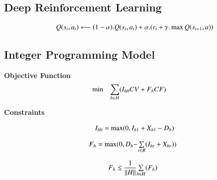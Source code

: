 \documentclass{elsarticle}
\begin{document}
\subsection{Deep Reinforcement Learning}


\begin{equation}
	\begin{array}{ll@{}ll}
	& \displaystyle Q(s_{t},a_{t}) \longleftarrow  (1 - \alpha ).Q(s_{t},a_{t}) + \alpha .(r_{t} + \gamma . \max Q(s_{t+1},a))\\
	\end{array}
	\label{eq:Eq32}
	\end{equation}	
		



\subsection{Integer Programming Model}

		
	\textbf{Objective Function}
	\begin{equation}
	\begin{array}{ll@{}ll}
	\min  & \displaystyle\sum\limits_{h \in H}&(I_{h0}CV + F_{h}CF)\\
	\end{array}
	\label{eq:Eq31}
	\end{equation}

	\textbf{Constraints}
	
	\begin{equation}
	\begin{array}{ll@{}ll}
	& \displaystyle I_{h0} = \max(0, I_{h1} + X_{h1} - D_{h})\\
	\end{array}
	\label{eq:Eq32}
	\end{equation}	
		
	\begin{equation}
	\begin{array}{ll@{}ll}
	& \displaystyle F_{h} = \max(0, D_{h} - &\sum\limits_{r \in R}(I_{hr} + X_{hr}))\\
	\end{array}
	\label{eq:Eq33}	
	\end{equation}
	
	\begin{equation}
	\begin{array}{ll@{}ll}
	& \displaystyle F_{h} \leq \frac{1}{\| H \|} &\sum\limits_{h \in H}(F_{h})\\
	\end{array}
	\label{eq:Eq33}	
	\end{equation}
	
\end{document}
